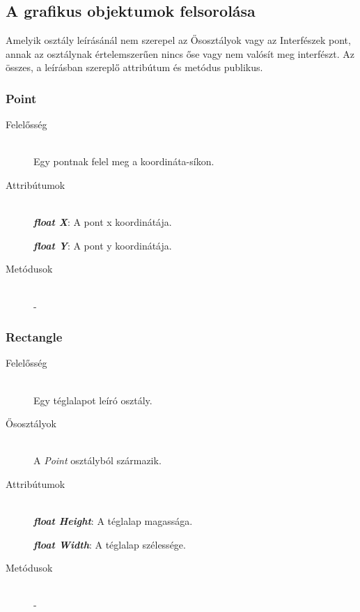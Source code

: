 \subsection{A grafikus objektumok felsorolása}
Amelyik osztály leírásánál nem szerepel az Ősosztályok vagy az Interfészek pont, annak az osztálynak értelemszerűen nincs őse vagy nem valósít meg interfészt. Az összes, a leírásban szereplő attribútum és metódus publikus.

\subsubsection{Point}
	\begin{description}
		\item[Felelősség] \hfill \\
		Egy pontnak felel meg a koordináta-síkon.
		
		\item[Attribútumok]\hfill \\
		\textbf{\emph{float X}}: A pont x koordinátája.
		
		\textbf{\emph{float Y}}: A pont y koordinátája.		
				
		\item[Metódusok]\hfill \\
		-

	\end{description}
	
\subsubsection{Rectangle}
	\begin{description}
		\item[Felelősség] \hfill \\
		Egy téglalapot leíró osztály.
		
		\item[Ősosztályok] \hfill \\
		A {\itshape Point}	osztályból származik.		
		
		\item[Attribútumok]\hfill \\
		\textbf{\emph{float Height}}: A téglalap magassága.
		
		\textbf{\emph{float Width}}: A téglalap szélessége.		
				
		\item[Metódusok]\hfill \\
		-

	\end{description}
	
